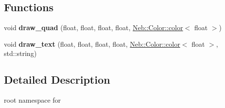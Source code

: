 \subsection*{\-Functions}
\begin{DoxyCompactItemize}
\item 
\hypertarget{namespaceglutpp_a7e8ef734c6531ececd6a4236ca9b38e5}{void {\bfseries draw\-\_\-quad} (float, float, float, float, \hyperlink{classNeb_1_1Color_1_1color}{\-Neb\-::\-Color\-::color}$<$ float $>$)}\label{namespaceglutpp_a7e8ef734c6531ececd6a4236ca9b38e5}

\item 
\hypertarget{namespaceglutpp_a3ab39b1c0806f2f023ecb161099b1381}{void {\bfseries draw\-\_\-text} (float, float, float, float, \hyperlink{classNeb_1_1Color_1_1color}{\-Neb\-::\-Color\-::color}$<$ float $>$, std\-::string)}\label{namespaceglutpp_a3ab39b1c0806f2f023ecb161099b1381}

\end{DoxyCompactItemize}


\subsection{\-Detailed \-Description}
root namespace for  